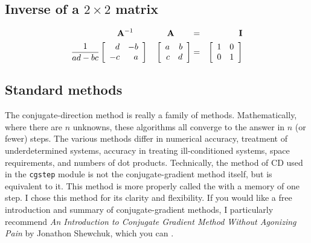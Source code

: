 \subsection{Inverse of a $2\times 2$ matrix}

\begin{eqnarray}
\bold A ^{-1} \quad\quad\quad\quad \bold A \quad\quad &=& \ \quad\bold I
\\
\label{eqn:twobytwoinv}
\frac{1}{ad-bc}
\left[
\begin{array}{rr}
d & -b  \\
-c & a
\end{array}
\right]
\quad
\left[
\begin{array}{rr}
a & b  \\
c & d
\end{array}
\right]
&=&
\left[
\begin{array}{rr}
1 & 0  \\
0 & 1
\end{array}
\right]
\end{eqnarray}




\subsection{Standard methods}
The conjugate-direction method is really a family of methods.
Mathematically, where there are $n$ unknowns, these algorithms all
converge to the answer in $n$ (or fewer) steps.  The various methods
differ in numerical accuracy, treatment of underdetermined systems,
accuracy in treating ill-conditioned systems, space requirements, and
numbers of dot products.  Technically, the method of CD used in the
\texttt{cgstep} module 
is not the
conjugate-gradient method itself, but is equivalent to it.  This
method is more properly called the 
with a memory of one step.  I chose this method for its clarity and
flexibility.  If you would like a free introduction and summary of
conjugate-gradient methods, I particularly recommend {\it An
  Introduction to Conjugate Gradient Method Without Agonizing Pain }
by Jonathon Shewchuk, which you can .

